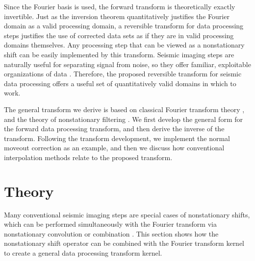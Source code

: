 Since the Fourier basis is used, the forward transform is theoretically exactly invertible.
Just as the inversion theorem quantitatively justifies the Fourier domain as a valid processing domain, a reversible transform for data processing steps justifies the use of corrected data sets as if they are in valid processing domains themselves.
Any processing step that can be viewed as a nonstationary shift can be easily implemented by this transform.
Seismic imaging steps are naturally useful for separating signal from noise, so they offer familiar, exploitable organizations of data \citep{mcmechan_sun91,yu_etal05}.
Therefore, the proposed reversible transform for seismic data processing offers a useful set of quantitatively valid domains in which to work.
 
The general transform we derive is based on classical Fourier transform theory \citep{papoulis62,sneddon95}, and the theory of nonstationary filtering \citep{margrave98}.
We first develop the general form for the forward data processing transform, and then derive the inverse of the transform.  Following the transform development, we implement the normal moveout correction as an example, and then we discuss how conventional interpolation methods relate to the proposed transform.

\section{Theory}
\label{sec:DPTt}
Many conventional seismic imaging steps are special cases of nonstationary shifts, which can be performed simultaneously with the Fourier transform via nonstationary convolution or combination \citep{margrave98}.  This section shows how the nonstationary shift operator can be combined with the Fourier transform kernel to create a general data processing transform kernel.



